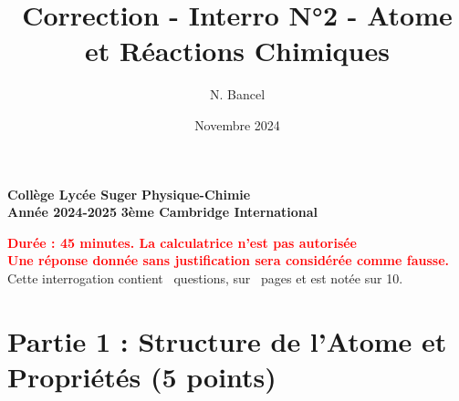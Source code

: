 \documentclass{exam}
\title{Correction - Interro N°2 - Atome et Réactions Chimiques}
\author{N. Bancel}
\date{Novembre 2024}
\begin{document}
\textbf{Collège Lycée Suger}
\hfill
\textbf{Physique-Chimie} \\

\textbf{Année 2024-2025}
\hfill
\textbf{3ème Cambridge International} \par

{\let\newpage\relax\maketitle}

\begin{center}
\textbf{\textcolor{red}{Durée : 45 minutes. La calculatrice n'est pas autorisée}} \\
\textbf{\textcolor{red}{Une réponse donnée sans justification sera considérée comme fausse.}} \\
Cette interrogation contient \numquestions\ questions, sur \numpages\ pages et est notée sur 10. 
\end{center}

\section*{Partie 1 : Structure de l'Atome et Propriétés (5 points)}
\end{document}
